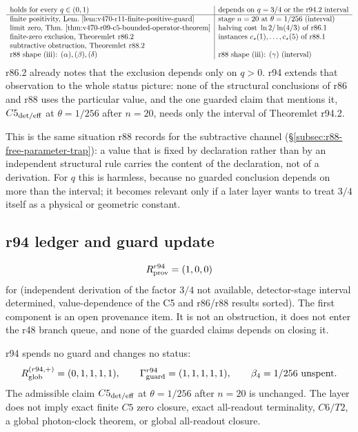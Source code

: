 \[
\begin{array}{l|l}
\text{holds for every } q\in(0,1) & \text{depends on } q=3/4 \text{ or the r94.2 interval}\\
\hline
\text{finite positivity, Lem.~\ref{lem:v470-r11-finite-positive-guard}}
 & \text{stage } n=20 \text{ at } \theta=1/256 \text{ (interval)}\\
\text{limit zero, Thm.~\ref{thm:v470-r09-c5-bounded-operator-theorem}}
 & \text{halving cost } \ln2/\ln(4/3) \text{ of r86.1}\\
\text{finite-zero exclusion, Theoremlet r86.2}
 & \text{instances } c_\star(1),\dots,c_\star(5) \text{ of r88.1}\\
\text{subtractive obstruction, Theoremlet r88.2} & \\
\text{r88 shape (iii): } (\alpha),(\beta),(\delta) &
 \text{r88 shape (iii): } (\gamma) \text{ (interval)}
\end{array}
\]
r86.2 already notes that the exclusion depends only on \(q>0\).  r94 extends that observation to
the whole status picture: none of the structural conclusions of r86 and r88 uses the particular
value, and the one guarded claim that mentions it,
\(C5_{\rm det/eff}\) at \(\theta=1/256\) after \(n=20\), needs only the interval of
Theoremlet r94.2.

This is the same situation r88 records for the subtractive channel
(\S\ref{subsec:r88-free-parameter-trap}): a value that is fixed by declaration rather than by an
independent structural rule carries the content of the declaration, not of a derivation.  For
\(q\) this is harmless, because no guarded conclusion depends on more than the interval; it
becomes relevant only if a later layer wants to treat \(3/4\) itself as a physical or
geometric constant.

\subsection*{r94 ledger and guard update}
\label{subsec:r94-ledger-guard}

\[
R_{\rm prov}^{r94}=(1,0,0)
\]
for (independent derivation of the factor \(3/4\) not available, detector-stage interval
determined, value-dependence of the C5 and r86/r88 results sorted).  The first component is
an open provenance item.  It is not an obstruction, it does not enter the r48 branch queue, and
none of the guarded claims depends on closing it.

r94 spends no guard and changes no status:
\[
R_{\rm glob}^{(r94,+)}=(0,1,1,1,1),
\qquad
\Gamma_{\rm guard}^{r94}=(1,1,1,1,1),
\qquad
\beta_4=1/256\ \text{unspent}.
\]
The admissible claim \(C5_{\rm det/eff}\) at \(\theta=1/256\) after \(n=20\) is unchanged.  The
layer does not imply exact finite \(C5\) zero closure, exact all-readout terminality,
\(C6/T2\), a global photon-clock theorem, or global all-readout closure.

